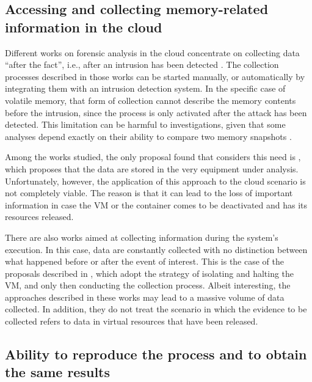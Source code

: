 \documentclass[conference]{IEEEtran}
\begin{document}
\subsection{Accessing and collecting memory-related information in the cloud}

Different works on forensic analysis in the cloud concentrate on collecting data “after the fact”, i.e., after an intrusion has been detected \cite{Reichert_Auto_acquisition:2015,Poisel_VMI:2013,Dykstra_FROST:2013,George_DF2CE:2012,Sang_Log_approach:2013}. 
%
The collection processes described in those works can be started manually, or automatically by integrating them with an intrusion detection system. 
%
In the specific case of volatile memory, that form of collection cannot describe the memory contents before the intrusion, since the process is only activated after the attack has been detected.
%
This limitation can be harmful to investigations, given that some analyses depend exactly on their ability to compare two memory snapshots \cite{Case_Memory_Forensics:2014}. 


Among the works studied, the only proposal found that considers this need is \cite{Dezfouli_Backup_approach:2012}, which proposes that the data are stored in the very equipment under analysis.
%
Unfortunately, however, the application of this approach to the cloud scenario is not completely viable.
%
The reason is that it can lead to the loss of important information in case the VM or the container comes to be deactivated and has its resources released.


There are also works aimed at collecting information during the system's execution.
%
In this case, data are constantly collected with no distinction between what happened before or after the event of interest.
%
This is the case of the proposals described in \cite{Poisel_VMI:2013,Dykstra_FROST:2013,Sang_Log_approach:2013}, which adopt the strategy of isolating and halting the VM, and only then conducting the collection process. 
%
Albeit interesting, the approaches described in these works may lead to a massive volume of data collected.
%
In addition, they do not treat the scenario in which the evidence to be collected refers to data in virtual resources that have been released.


\subsection{Ability to reproduce the process and to obtain the same results}
\end{document}
